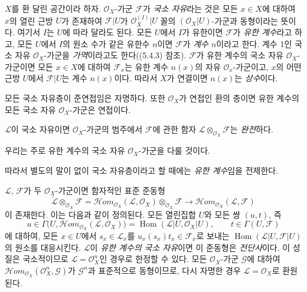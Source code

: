 \begin{env}[5.4.1]
\label{0.5.4.1-ko}
$X$를 환 달린 공간이라 하자. $\mathcal O_X$-가군 $\mathcal F$가
\emph{국소 자유}라는 것은 모든 $x\in X$에 대하여 $x$의 열린 근방
$U$가 존재하여 $\mathcal F|U$가
$\mathcal O_X^{(I)}|U$ 꼴의 $(\mathcal O_X|U)$-가군과 동형이라는
뜻이다. 여기서 $I$는 $U$에 따라 달라도 된다. 모든 $U$에서 $I$가
유한이면 $\mathcal F$가 \emph{유한 계수}라고 하고, 모든 $U$에서
$I$의 원소 수가 같은 유한수 $n$이면 $\mathcal F$가
\emph{계수 $n$}이라고 한다. 계수 1인 국소 자유
$\mathcal O_X$-가군을 \emph{가역}이라고도 한다((5.4.3) 참조).
$\mathcal F$가 유한 계수의 국소 자유 $\mathcal O_X$-가군이면 모든
$x\in X$에 대하여 $\mathcal F_x$는 유한 계수 $n(x)$의 자유
$\mathcal O_x$-가군이고, $x$의 어떤 근방 $U$에서 $\mathcal F|U$는
계수 $n(x)$이다. 따라서 $X$가 연결이면 $n(x)$는 \emph{상수}이다.

모든 국소 자유층이 준연접임은 자명하다. 또한 $\mathcal O_X$가
연접인 환의 층이면 유한 계수의 모든 국소 자유 $\mathcal O_X$-가군은
연접이다.

$\mathcal L$이 국소 자유이면 $\mathcal O_X$-가군의 범주에서
$\mathcal F$에 관한 함자
$\mathcal L\otimes_{\mathcal O_X}\mathcal F$는 \emph{완전}하다.

우리는 주로 유한 계수의 국소 자유 $\mathcal O_X$-가군을 다룰 것이다.


따라서 별도의 말이 없이 국소 자유층이라고 할 때에는
\emph{유한 계수}임을 전제한다.
\end{env}

\begin{env}[5.4.2]
\label{0.5.4.2-ko}
$\mathcal L$, $\mathcal F$가 두 $\mathcal O_X$-가군이면 함자적인 표준
준동형
\[
  \check{\mathcal L}\otimes_{\mathcal O_X}\mathcal F
  =\mathcal H\!om_{\mathcal O_X}(\mathcal L,\mathcal O_X)
   \otimes_{\mathcal O_X}\mathcal F
  \longrightarrow
  \mathcal H\!om_{\mathcal O_X}(\mathcal L,\mathcal F)
  \tag{5.4.2.1}\label{0.5.4.2.1-ko}
\]
이 존재한다. 이는 다음과 같이 정의된다. 모든 열린집합 $U$와 모든 쌍
$(u,t)$, 즉
\[
  u\in\Gamma\bigl(U,
    \mathcal H\!om_{\mathcal O_X}(\mathcal L,\mathcal O_X)\bigr)
  =\operatorname{Hom}(\mathcal L|U,\mathcal O_X|U),
  \qquad
  t\in\Gamma(U,\mathcal F)
\]
에 대하여, 모든 $x\in U$에서 $s_x\in\mathcal L_x$를
$u_x(s_x)t_x\in\mathcal F_x$로 보내는
$\operatorname{Hom}(\mathcal L|U,\mathcal F|U)$의 원소를 대응시킨다.
$\mathcal L$이 \emph{유한 계수의 국소 자유}이면 이 준동형은
\emph{전단사}이다. 이 성질은 국소적이므로
$\mathcal L=\mathcal O_X^n$인 경우로 한정할 수 있다. 모든
$\mathcal O_X$-가군 $\mathcal G$에 대하여
$\mathcal H\!om_{\mathcal O_X}(\mathcal O_X^n,\mathcal G)$가
$\mathcal G^n$과 표준적으로 동형이므로, 다시 자명한 경우
$\mathcal L=\mathcal O_X$로 환원된다.
\end{env}

